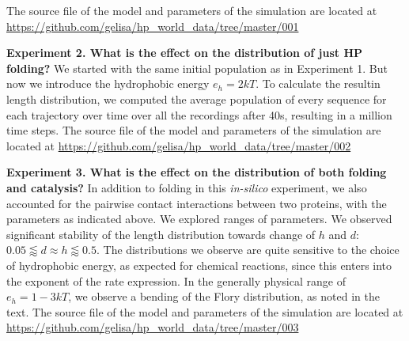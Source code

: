 \documentclass[twocolumn,letterpaper]{revtex4-1}
\begin{document}
The source file of the model and parameters of the simulation are located at 
\url{https://github.com/gelisa/hp_world_data/tree/master/001}

\textbf{Experiment 2. What is the effect on the distribution of just HP folding?}
We started with the same initial population as in Experiment 1. But now we introduce the 
hydrophobic 
energy $e_h= 2kT$. To calculate the resultin length distribution, we computed the average 
population 
of every sequence for each trajectory over time over all the recordings after 40s, resulting in a 
million time steps. The source file of the model and parameters of the 
simulation are located at \url{https://github.com/gelisa/hp_world_data/tree/master/002}


\textbf{Experiment 3. What is the effect on the distribution of both folding and catalysis?}
In addition to folding in this \textit{in-silico} experiment, we also accounted for the pairwise 
contact interactions between two proteins, with the parameters as indicated above. We explored 
ranges of parameters.  We observed significant stability of the length distribution towards change 
of $h$ and $d$: $0.05\lessapprox d\approx h \lessapprox 0.5$.  The 
distributions we observe are quite sensitive to the choice of hydrophobic energy, as expected for 
chemical reactions, since this enters into the exponent of the rate expression. In the generally 
physical range of $e_h= 1-3 kT$, we observe a bending of the Flory distribution, as noted in the 
text. The source file of the model and parameters of the 
simulation are located at \url{https://github.com/gelisa/hp_world_data/tree/master/003}



 
\end{document}

